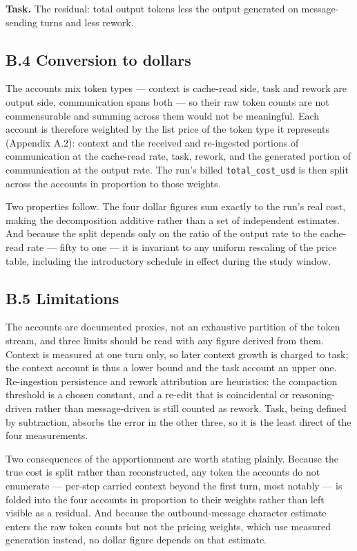 \documentclass[11pt,a4paper]{article}
\begin{document}
\textbf{Task.} The residual: total output tokens less the output generated on
message-sending turns and less rework.

\subsection*{B.4 \quad Conversion to dollars}

The accounts mix token types --- context is cache-read side, task and rework are
output side, communication spans both --- so their raw token counts are not
commensurable and summing across them would not be meaningful. Each account is
therefore weighted by the list price of the token type it represents (Appendix
A.2): context and the received and re-ingested portions of communication at the
cache-read rate, task, rework, and the generated portion of communication at the
output rate. The run's billed \texttt{total\_cost\_usd} is then split across the
accounts in proportion to those weights.

Two properties follow. The four dollar figures sum exactly to the run's real cost,
making the decomposition additive rather than a set of independent estimates. And
because the split depends only on the ratio of the output rate to the cache-read
rate --- fifty to one --- it is invariant to any uniform rescaling of the price
table, including the introductory schedule in effect during the study window.

\subsection*{B.5 \quad Limitations}

The accounts are documented proxies, not an exhaustive partition of the token
stream, and three limits should be read with any figure derived from them.
Context is measured at one turn only, so later context growth is charged to task;
the context account is thus a lower bound and the task account an upper one.
Re-ingestion persistence and rework attribution are heuristics: the compaction
threshold is a chosen constant, and a re-edit that is coincidental or
reasoning-driven rather than message-driven is still counted as rework. Task,
being defined by subtraction, absorbs the error in the other three, so it is the
least direct of the four measurements.

Two consequences of the apportionment are worth stating plainly. Because the true
cost is split rather than reconstructed, any token the accounts do not enumerate
--- per-step carried context beyond the first turn, most notably --- is folded
into the four accounts in proportion to their weights rather than left visible as
a residual. And because the outbound-message character estimate enters the raw
token counts but not the pricing weights, which use measured generation instead,
no dollar figure depends on that estimate.
\end{document}
